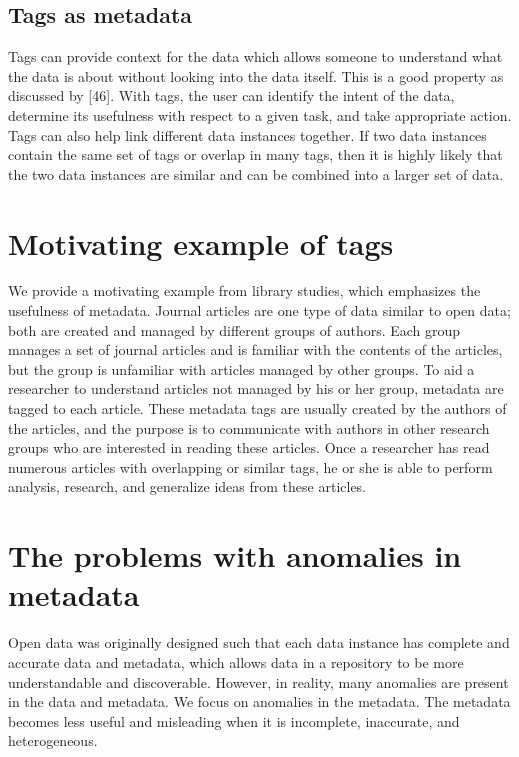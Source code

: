 \subsection{Tags as metadata}

Tags can provide context for the data which allows someone to understand what the data is about without looking into the data itself. This is a good property as discussed by \cite{Wilkinson2016FAIR}[46]. With tags, the user can identify the intent of the data, determine its usefulness with respect to a given task, and take appropriate action. Tags can also help link different data instances together. If two data instances contain the same set of tags or overlap in many tags, then it is highly likely that the two data instances are similar and can be combined into a larger set of data.


\section{Motivating example of tags}
\label{sec:MotivatingExampleOfTags}

We provide a motivating example from library studies, which emphasizes the usefulness of metadata. Journal articles are one type of data similar to open data; both are created and managed by different groups of authors. Each group manages a set of journal articles and is familiar with the contents of the articles, but the group is unfamiliar with articles managed by other groups. To aid a researcher to understand articles not managed by his or her group, metadata are tagged to each article. These metadata tags are usually created by the authors of the articles, and the purpose is to communicate with authors in other research groups who are interested in reading these articles. Once a researcher has read numerous articles with overlapping or similar tags, he or she is able to perform analysis, research, and generalize ideas from these articles.

\section{The problems with anomalies in metadata}
\label{sec:TheProblemsWithAnomaliesInMetadata}

Open data was originally designed such that each data instance has complete and accurate data and metadata, which allows data in a repository to be more understandable and discoverable. However, in reality, many anomalies are present in the data and metadata. We focus on anomalies in the metadata. The metadata becomes less useful and misleading when it is incomplete, inaccurate, and heterogeneous.

